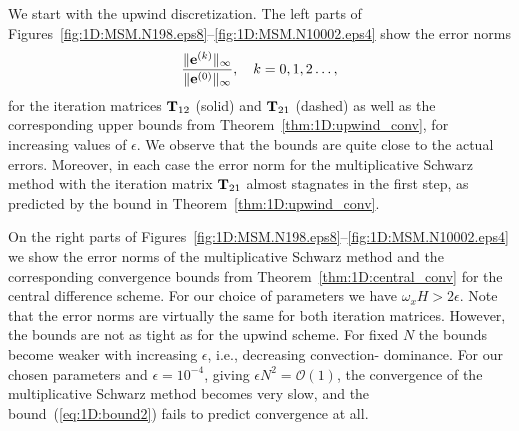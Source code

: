 We start with the upwind discretization. The left parts of
Figures~\ref{fig:1D:MSM.N198.eps8}--\ref{fig:1D:MSM.N10002.eps4}
show the error norms
%
$$\frac{\|\mathbf{e}^{(k)}\|_\infty}{\|\mathbf{e}^{(0)}\|_\infty},\quad  k=0,1,2\dots,$$
%
for the iteration matrices $\mathbf{T}_{12}$ (solid) and $\mathbf{T}_{21}$
(dashed) as well as the corresponding upper bounds from
Theorem~\ref{thm:1D:upwind_conv},
for increasing values of $\epsilon$. We observe that the bounds are
quite close to the actual errors. Moreover, in each case the error norm for
the multiplicative Schwarz method with the iteration matrix $\mathbf{T}_{21}$
almost stagnates in the first step, as predicted by the bound in
Theorem~\ref{thm:1D:upwind_conv}.

On the right parts of Figures~\ref{fig:1D:MSM.N198.eps8}--\ref{fig:1D:MSM.N10002.eps4} we show the
error norms of the multiplicative Schwarz method and the corresponding
convergence bounds from Theorem~\ref{thm:1D:central_conv} for the central
difference scheme.
For our choice of parameters we have $\omega_x H > 2\epsilon$. Note that the
error norms are virtually the same for both iteration matrices. However,
the bounds are not as tight as for the upwind scheme. For fixed $N$ the bounds
become weaker with increasing $\epsilon$, i.e., decreasing convection-
dominance. For our chosen parameters and $\epsilon=10^{-4}$,
giving $\epsilon N^2=\mathscr{O}(1)$, the convergence of the multiplicative
Schwarz method becomes very slow, and the bound~(\ref{eq:1D:bound2}) fails to
predict convergence at all.

